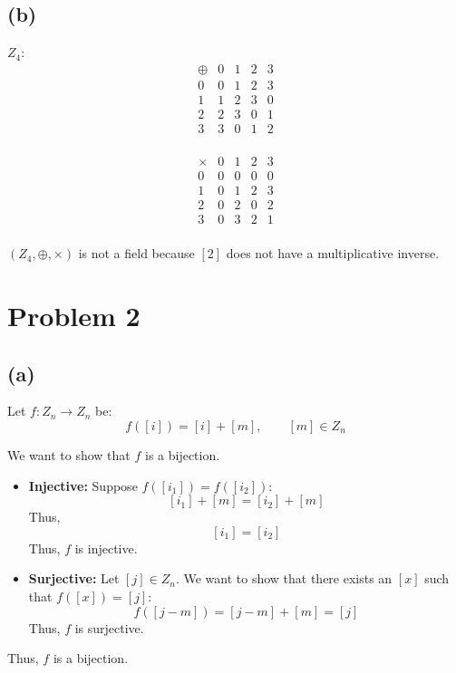 \documentclass{article}
\begin{document}
\subsection*{(b)}
\(Z_4\):
\[
   \begin{array}{c|cccc}
   \oplus & 0 & 1 & 2 & 3 \\\hline
   0 & 0 & 1 & 2 & 3 \\
   1 & 1 & 2 & 3 & 0 \\
   2 & 2 & 3 & 0 & 1 \\
   3 & 3 & 0 & 1 & 2 \\
   \end{array}
\]

\[
\begin{array}{c|cccc}
\times & 0 & 1 & 2 & 3 \\\hline
0 & 0 & 0 & 0 & 0 \\
1 & 0 & 1 & 2 & 3 \\
2 & 0 & 2 & 0 & 2 \\
3 & 0 & 3 & 2 & 1 \\
\end{array}
\]

\((Z_4, \oplus, \times)\) is not a field because \([2]\) does not have a multiplicative inverse. \\

\section*{Problem 2}


\subsection*{(a)}

Let \(f: Z_n \to Z_n\) be:
\[
   f([i]) = [i] + [m], \qquad [m] \in Z_n
\]

We want to show that \(f\) is a bijection.
\begin{itemize}
   \item \textbf{Injective:} Suppose \(f([i_1]) = f([i_2])\):
   \[
      [i_1] + [m] = [i_2] + [m]
   \]
   Thus,
   \[
      [i_1] = [i_2]
   \]
   Thus, \(f\) is injective.
   \item \textbf{Surjective:} Let \([j] \in Z_n\). We want to show that there exists an \([x]\) such that \(f([x]) = [j]\):
   \[
      f([j - m]) = [j - m] + [m] = [j]
   \]
   Thus, \(f\) is surjective.
\end{itemize}
Thus, \(f\) is a bijection.
\end{document}
